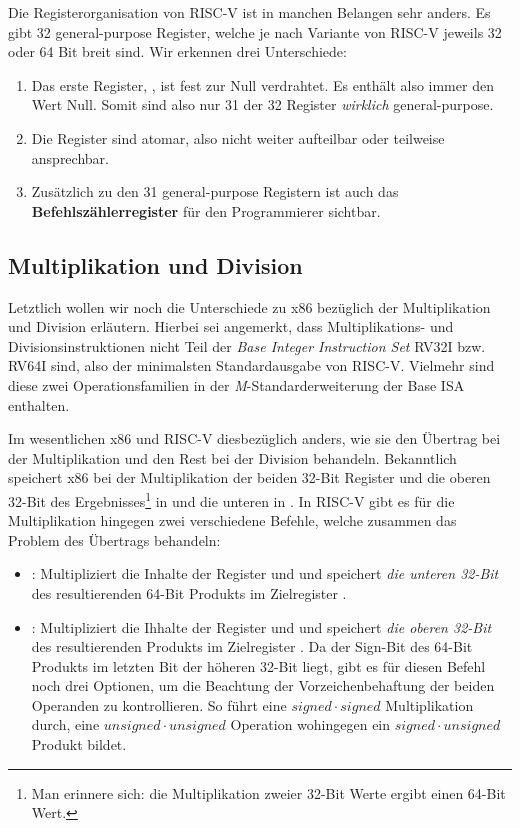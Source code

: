 Die Registerorganisation von RISC-V ist in manchen Belangen sehr anders. Es gibt
32 general-purpose Register, welche je nach Variante von RISC-V jeweils 32 oder
64 Bit breit sind. Wir erkennen drei Unterschiede:

\begin{enumerate}
  \item Das erste Register, , ist fest zur Null verdrahtet. Es enthält
    also immer den Wert Null. Somit sind also nur 31 der 32 Register
    \emph{wirklich} general-purpose.
  \item Die Register sind atomar, also nicht weiter aufteilbar oder teilweise
    ansprechbar.
  \item Zusätzlich zu den 31 general-purpose Registern ist auch das
    \textbf{Befehlszählerregister}  für den Programmierer sichtbar.
\end{enumerate}

\subsection{Multiplikation und Division}

Letztlich wollen wir noch die Unterschiede zu x86 bezüglich der Multiplikation
und Division erläutern. Hierbei sei angemerkt, dass Multiplikations- und
Divisionsinstruktionen nicht Teil der \emph{Base Integer Instruction Set} RV32I
bzw. RV64I sind, also der minimalsten Standardausgabe von RISC-V. Vielmehr sind
diese zwei Operationsfamilien in der \emph{M}-Standarderweiterung der Base ISA
enthalten.

Im wesentlichen x86 und RISC-V diesbezüglich anders, wie sie den Übertrag bei
der Multiplikation und den Rest bei der Division behandeln. Bekanntlich
speichert x86 bei der Multiplikation der beiden 32-Bit Register  und
 die oberen 32-Bit des Ergebnisses\footnote{Man erinnere sich: die
  Multiplikation zweier 32-Bit Werte ergibt einen 64-Bit Wert.} in 
und die unteren in . In RISC-V gibt es für die Multiplikation hingegen
zwei verschiedene Befehle, welche zusammen das Problem des Übertrags behandeln:

\begin{itemize}
  \item {}: Multipliziert die Inhalte der Register
     und  und speichert \emph{die unteren 32-Bit} des
    resultierenden 64-Bit Produkts im Zielregister .
  \item {}: Multipliziert die Ihhalte der Register
     und  und speichert \emph{die oberen 32-Bit} des
    resultierenden Produkts im Zielregister . Da der Sign-Bit des
    64-Bit Produkts im letzten Bit der höheren 32-Bit liegt, gibt es für diesen
    Befehl noch drei Optionen, um die Beachtung der Vorzeichenbehaftung der
    beiden Operanden zu kontrollieren. So führt  eine
    $signed \cdot signed$ Multiplikation durch, 
    eine $unsigned \cdot unsigned$ Operation wohingegen
     ein $signed \cdot unsigned$ Produkt bildet.
\end{itemize}

